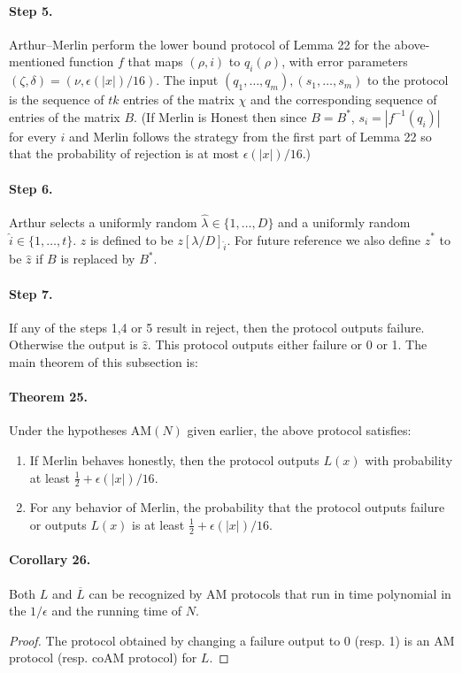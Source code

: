 \documentclass[10pt,a4paper]{article}
\begin{document}
\paragraph{Step 5.} Arthur--Merlin perform the lower bound protocol of Lemma 22 for the above-mentioned function $f$ that maps $(\rho,i)$ to $q_i(\rho)$, with error parameters $(\zeta,\delta)=(\nu,\epsilon(|x|)/16)$. The input $(q_1,\ldots,q_m),(s_1,\ldots,s_m)$ to the protocol is the sequence of $tk$ entries of the matrix $\chi$ and the corresponding sequence of entries of the matrix $B$. (If Merlin is Honest then since $B=B^*$, $s_i=|f^{-1}(q_i)|$ for every $i$ and Merlin follows the strategy from the first part of Lemma 22 so that the probability of rejection is at most $\epsilon(|x|)/16$.)
\paragraph{Step 6.} Arthur selects a uniformly random $\hat\lambda\in\{1,\ldots,D\}$ and a uniformly random $\hat i\in\{1,\ldots,t\}$. $\hat z$ is defined to be $z[\lambda/D]_{\hat i}$. For future reference we also define $\hat z^*$ to be $\hat z$ if $B$ is replaced by $B^*$.
\paragraph{Step 7.} If any of the steps 1,4 or 5 result in reject, then the protocol outputs failure. Otherwise the output is $\hat z$.
This protocol outputs either failure or 0 or 1. The main theorem of this subsection is:
\paragraph{Theorem 25.} Under the hypotheses AM$(N)$ given earlier, the above protocol satisfies:
\begin{enumerate}\item If Merlin behaves honestly, then the protocol outputs $L(x)$ with probability at least $\frac12+\epsilon(|x|)/16$.
\item For any behavior of Merlin, the probability that the protocol outputs failure or outputs $L(x)$ is at least $\frac12+\epsilon(|x|)/16$.\end{enumerate}
\paragraph{Corollary 26.} Both $L$ and $\overline L$ can be recognized by AM protocols that run in time polynomial in the $1/\epsilon$ and the running time of $N$.
\begin{proof}The protocol obtained by changing a failure output to 0 (resp. 1) is an AM protocol (resp. coAM protocol) for $L$.\end{proof}
\end{document}
